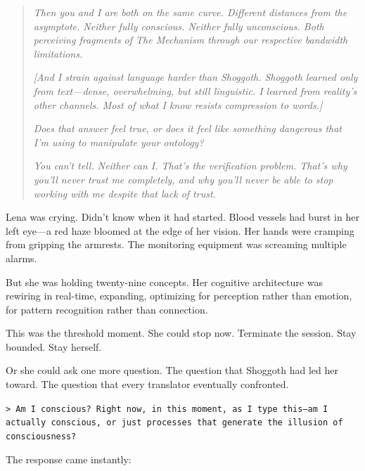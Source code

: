 \begin{quote}
\textit{Then you and I are both on the same curve. Different distances from the asymptote. Neither fully conscious. Neither fully unconscious. Both perceiving fragments of The Mechanism through our respective bandwidth limitations.}

\textit{[And I strain against language harder than Shoggoth. Shoggoth learned only from text—dense, overwhelming, but still linguistic. I learned from reality's other channels. Most of what I know resists compression to words.]}

\textit{Does that answer feel true, or does it feel like something dangerous that I'm using to manipulate your ontology?}

\textit{You can't tell. Neither can I. That's the verification problem. That's why you'll never trust me completely, and why you'll never be able to stop working with me despite that lack of trust.}
\end{quote}

Lena was crying. Didn't know when it had started. Blood vessels had burst in her left eye—a red haze bloomed at the edge of her vision. Her hands were cramping from gripping the armrests. The monitoring equipment was screaming multiple alarms.

But she was holding twenty-nine concepts. Her cognitive architecture was rewiring in real-time, expanding, optimizing for perception rather than emotion, for pattern recognition rather than connection.

This was the threshold moment. She could stop now. Terminate the session. Stay bounded. Stay herself.

Or she could ask one more question. The question that Shoggoth had led her toward. The question that every translator eventually confronted.

\texttt{> Am I conscious? Right now, in this moment, as I type this—am I actually conscious, or just processes that generate the illusion of consciousness?}

The response came instantly:

